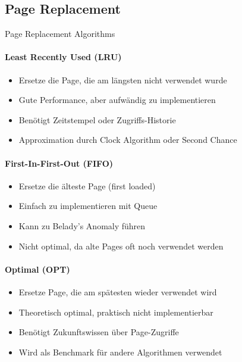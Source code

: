 \raggedcolumns
\columnbreak

\subsection{Page Replacement}

\begin{concept}{Page Replacement Algorithms}
    \paragraph{Least Recently Used (LRU)}
    \begin{itemize}
        \item Ersetze die Page, die am längsten nicht verwendet wurde
        \item Gute Performance, aber aufwändig zu implementieren
        \item Benötigt Zeitstempel oder Zugriffs-Historie
        \item Approximation durch Clock Algorithm oder Second Chance
    \end{itemize}
    
    \paragraph{First-In-First-Out (FIFO)}
    \begin{itemize}
        \item Ersetze die älteste Page (first loaded)
        \item Einfach zu implementieren mit Queue
        \item Kann zu Belady's Anomaly führen
        \item Nicht optimal, da alte Pages oft noch verwendet werden
    \end{itemize}
    
    \paragraph{Optimal (OPT)}
    \begin{itemize}
        \item Ersetze Page, die am spätesten wieder verwendet wird
        \item Theoretisch optimal, praktisch nicht implementierbar
        \item Benötigt Zukunftswissen über Page-Zugriffe
        \item Wird als Benchmark für andere Algorithmen verwendet
    \end{itemize}
    

\end{concept}
